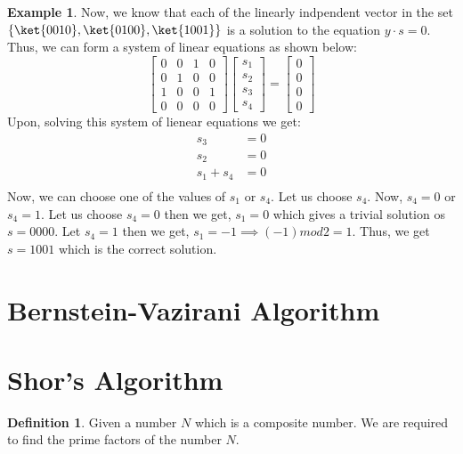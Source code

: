 \documentclass[12pt, oneside]{book}
\theoremstyle{definition}
\newtheorem{definition}{Definition}[section]
\theoremstyle{definition}
\newtheorem{example}{Example}[section]
\theoremstyle{remark}
\begin{document}
\begin{example}
    Now, we know that each of the linearly indpendent vector in the set $\{\ket{0010},\ket{0100},\ket{1001}\}$ is a solution to the equation $y\cdot s=0$. Thus, we can form a system of linear equations as shown below:
    \[
    \begin{bmatrix}
        0 & 0 & 1 & 0 \\
        0 & 1 & 0 & 0 \\
        1 & 0 & 0 & 1 \\
        0 & 0 & 0 & 0
    \end{bmatrix}
    \begin{bmatrix}
        s_1 \\
        s_2 \\
        s_3 \\
        s_4 
    \end{bmatrix}
    =
    \begin{bmatrix}
        0 \\
        0 \\
        0 \\
        0
    \end{bmatrix}
    \]
    Upon, solving this system of lienear equations we get:
    \begin{align*}
    s_3&=0 \\
    s_2&=0 \\
    s_1 + s_4 &=0 \\
    \end{align*}
    Now, we can choose one of the values of $s_1$ or $s_4$. Let us choose $s_4$.
    Now, $s_4=0$ or $s_4=1$. 
    Let us choose $s_4=0$ then we get, $s_1=0$ which gives a trivial solution os $s=0000$. Let $s_4=1$ then we get, $s_1=-1\implies (-1) mod 2=1$.
    Thus, we get $s=1001$ which is the correct solution.
\end{example}


\section{Bernstein-Vazirani Algorithm}

\section{Shor's Algorithm}
\begin{definition}
    Given a number $N$ which is a composite number. We are required to find the prime factors of the number $N$.
\end{definition}
\end{document}
